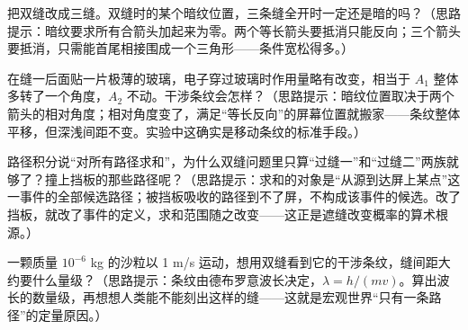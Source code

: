\begin{puzzles}
\item 把双缝改成三缝。双缝时的某个暗纹位置，三条缝全开时一定还是暗的吗？（思路提示：暗纹要求所有合箭头加起来为零。两个等长箭头要抵消只能反向；三个箭头要抵消，只需能首尾相接围成一个三角形——条件宽松得多。）
\item 在缝一后面贴一片极薄的玻璃，电子穿过玻璃时作用量略有改变，相当于 \(A_1\) 整体多转了一个角度，\(A_2\) 不动。干涉条纹会怎样？（思路提示：暗纹位置取决于两个箭头的相对角度；相对角度变了，满足“等长反向”的屏幕位置就搬家——条纹整体平移，但深浅间距不变。实验中这确实是移动条纹的标准手段。）
\item 路径积分说“对所有路径求和”，为什么双缝问题里只算“过缝一”和“过缝二”两族就够了？撞上挡板的那些路径呢？（思路提示：求和的对象是“从源到达屏上某点”这一事件的全部候选路径；被挡板吸收的路径到不了屏，不构成该事件的候选。改了挡板，就改了事件的定义，求和范围随之改变——这正是遮缝改变概率的算术根源。）
\item 一颗质量 \(10^{-6}\) kg 的沙粒以 1 m/s 运动，想用双缝看到它的干涉条纹，缝间距大约要什么量级？（思路提示：条纹由德布罗意波长决定，\(\lambda=h/(mv)\)。算出波长的数量级，再想想人类能不能刻出这样的缝——这就是宏观世界“只有一条路径”的定量原因。）
\end{puzzles}
